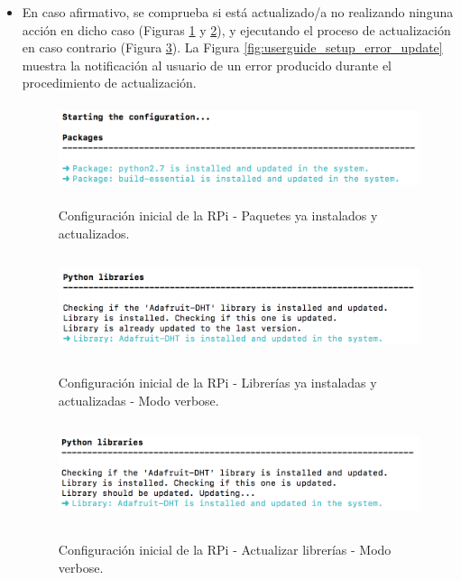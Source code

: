 \documentclass[12pt,a4paper, twoside]{report}
\begin{document}
	\begin{itemize}
		\item En caso afirmativo, se comprueba si está actualizado/a no realizando ninguna acción en dicho caso (Figuras \ref{fig:userguide_setup_packages_updated} y \ref{fig:userguide_setup_libraries_updated}), y ejecutando el proceso de actualización en caso contrario (Figura \ref{fig:userguide_setup_update_library}). La Figura \ref{fig:userguide_setup_error_update} muestra la notificación al usuario de un error producido durante el procedimiento de actualización.
		
		\begin{figure}[!ht]   
			\caption{Configuración inicial de la RPi - Paquetes ya instalados y actualizados.} 
			\begin{center} 
				\includegraphics[width=14cm,height=2.5cm]{Images/userGuide/setup/packages_updated} \\
				\label{fig:userguide_setup_packages_updated} 
			\end{center}  
		\end{figure}
			
		\begin{figure}[!ht]   
			\caption{Configuración inicial de la RPi - Librerías ya instaladas y actualizadas - Modo verbose.} 
			\begin{center} 
				\includegraphics[width=14cm,height=3cm]{Images/userGuide/setup/libraries_updated} \\
				\label{fig:userguide_setup_libraries_updated} 
			\end{center}  
		\end{figure}
		
		\begin{figure}[!ht]   
			\caption{Configuración inicial de la RPi - Actualizar librerías - Modo verbose.} 
			\begin{center} 
				\includegraphics[width=14cm,height=3cm]{Images/userGuide/setup/update_library} \\
				\label{fig:userguide_setup_update_library} 
			\end{center}  
		\end{figure}
		

\end{itemize}
\end{document}
